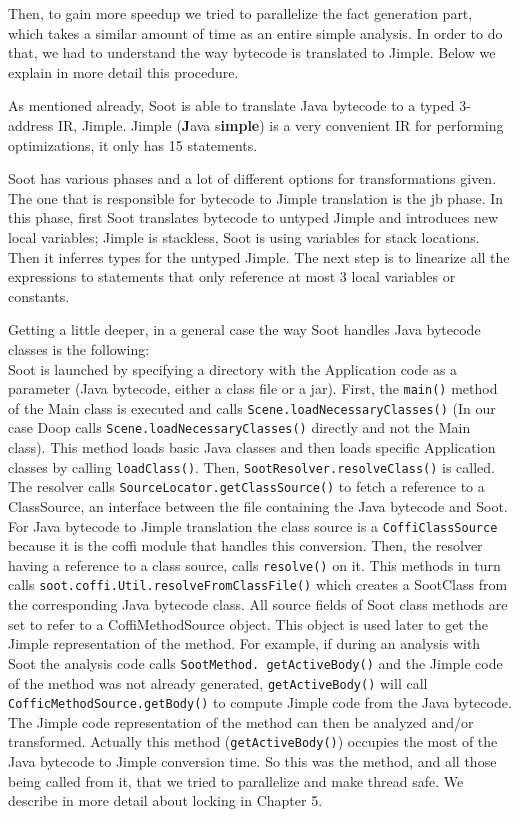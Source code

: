 \documentclass{dithesis}
\begin{document}
    	Then, to gain more speedup we tried to parallelize the fact generation part, which takes a similar amount of time as an entire simple analysis. In order to do that, we had to understand the way bytecode is translated to Jimple. Below we explain in more detail this procedure.

        As mentioned already, Soot is able to translate Java bytecode to a typed 3-address IR, Jimple. Jimple (\textbf{J}ava s\textbf{imple}) is a very convenient IR for performing optimizations, it only has 15 statements.

        Soot has various phases and a lot of different options for transformations given. The one that is responsible for bytecode to Jimple translation is the jb phase. In this phase, first Soot translates bytecode to untyped Jimple and introduces new local variables; Jimple is stackless, Soot is using variables for stack locations. Then it inferres types for the untyped Jimple. The next step is to linearize all the expressions to statements that only reference at most 3 local variables or constants.

        Getting a little deeper, in a general case the way Soot handles Java bytecode classes is the following: \\
        Soot is launched by specifying a directory with the Application code as a parameter (Java bytecode, either a class file or a jar). First, the \texttt{main()} method of the Main class is executed and calls \texttt{Scene.loadNecessaryClasses()} (In our case Doop calls \texttt{Scene.loadNecessaryClasses()} directly and not the Main class). This method loads basic Java classes and then loads specific Application classes by calling \texttt{loadClass()}. Then, \texttt{SootResolver.resolveClass()} is called. The resolver calls \texttt{SourceLocator.getClassSource()} to fetch a reference to a ClassSource, an interface between the file containing the Java bytecode and Soot. For Java bytecode to Jimple translation the class source is a \texttt{CoffiClassSource} because it is the coffi module that handles this conversion. Then, the resolver having a reference to a class source, calls \texttt{resolve()} on it. This methods in turn calls \texttt{soot.coffi.Util.resolveFromClassFile()} which creates a SootClass from the corresponding Java bytecode class. All source fields of Soot class methods are set to refer to a CoffiMethodSource object. This object is used later to get the Jimple representation of the method. For example, if during an analysis with Soot the analysis code calls \texttt{SootMethod. getActiveBody()} and the Jimple code of the method was not already generated,       \texttt{getActiveBody()} will call \texttt{CofficMethodSource.getBody()} to compute Jimple code from the Java bytecode. The Jimple code representation of the method can then be analyzed and/or transformed. Actually this method (\texttt{getActiveBody()}) occupies the most of the Java bytecode to Jimple conversion time. So this was the method, and all those being called from it, that we tried to parallelize and make thread safe. We describe in more detail about locking in Chapter 5. 
\end{document}
